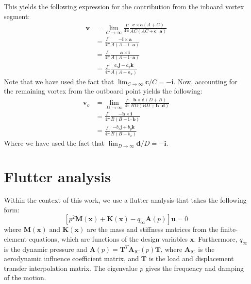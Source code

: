 \documentclass[12pt]{article}
\newcommand{\f}{\frac}
\newcommand{\mb}{\mathbf}
\begin{document}
This yields the following expression for the contribution from the
inboard vortex segment:
%
\begin{equation*}
  \begin{aligned}
    \mb{v} & = \lim_{C \rightarrow \infty} \f{\Gamma}{4\pi} \f{\mb{c} \times \mb{a}(A + C)}{AC(AC + \mb{c}\cdot \mb{a})} \\
    & = \f{\Gamma}{4\pi} \f{-\mb{i} \times \mb{a}}{A(A - \mb{i}\cdot \mb{a})} \\
    & = \f{\Gamma}{4\pi} \f{\mb{a} \times \mb{i}}{A(A - \mb{i}\cdot \mb{a})} \\
    & = \f{\Gamma}{4\pi} \f{a_{z} \mb{j} - a_{y}\mb{k}}{A(A - a_x)}
  \end{aligned}
\end{equation*}
Note that we have used the fact that $\lim_{C \rightarrow \infty}
\mb{c}/C = -\mb{i}$.  Now, accounting for the remaining vortex from
the outboard point yields the following:
\begin{equation*}
  \begin{aligned}
    \mb{v}_{o} & = \lim_{D \rightarrow \infty}\f{\Gamma}{4\pi} \f{ \mb{b} \times \mb{d}(D + B)}{BD(BD + \mb{b}\cdot \mb{d})} \\
    & = \f{\Gamma}{4\pi} \f{-\mb{b} \times \mb{i}}{B(B - \mb{i}\cdot \mb{b})} \\
    & = \f{\Gamma}{4\pi} \f{-b_{z} \mb{j} + b_{y} \mb{k}}{B(B - b_x)}
  \end{aligned}
\end{equation*}
Where we have used the fact that $\lim_{D \rightarrow \infty} \mb{d}/D
= -\mb{i}$.

\section{Flutter analysis}

Within the context of this work, we use a flutter analysis that takes
the following form:
\begin{equation}
  \label{eqn:flutter}
  \left[ p^2 \mb{M}(\mb{x}) + \mb{K}(\mb{x}) - q_{\infty} \mb{A}(p) \right] \mb{u} = 0
\end{equation}
%
where $\mb{M}(\mb{x})$ and $\mb{K}(\mb{x})$ are the mass and stiffness
matrices from the finite-element equations, which are functions of the
design variables $\mb{x}$. Furthermore, $q_{\infty}$ is the dynamic
pressure and $\mb{A}(p) = \mb{T}^{T} \mb{A}_{\text{IC}}(p) \mb{T}$,
where $\mb{A}_{\text{IC}}$ is the aerodynamic influence coefficient
matrix, and $\mb{T}$ is the load and displacement transfer
interpolation matrix. The eigenvalue $p$ gives the frequency and
damping of the motion. 
\end{document}
